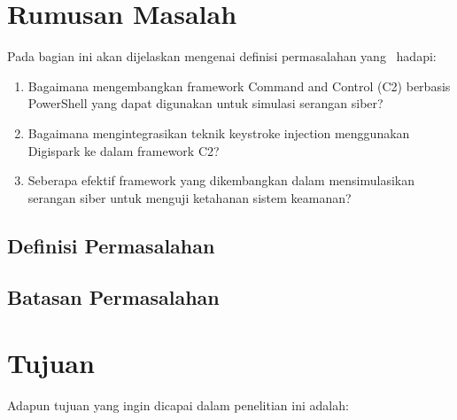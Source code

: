 \section{Rumusan Masalah}
Pada bagian ini akan dijelaskan mengenai definisi permasalahan 
yang \saya~hadapi:
\begin{enumerate}
    \item Bagaimana mengembangkan framework Command and Control (C2) berbasis PowerShell yang dapat digunakan untuk simulasi serangan siber?
    \item Bagaimana mengintegrasikan teknik keystroke injection menggunakan Digispark ke dalam framework C2?
    \item Seberapa efektif framework yang dikembangkan dalam mensimulasikan serangan siber untuk menguji ketahanan sistem keamanan?
\end{enumerate}





\subsection{Definisi Permasalahan}


\subsection{Batasan Permasalahan}


\section{Tujuan}
Adapun tujuan yang ingin dicapai dalam penelitian ini adalah:


